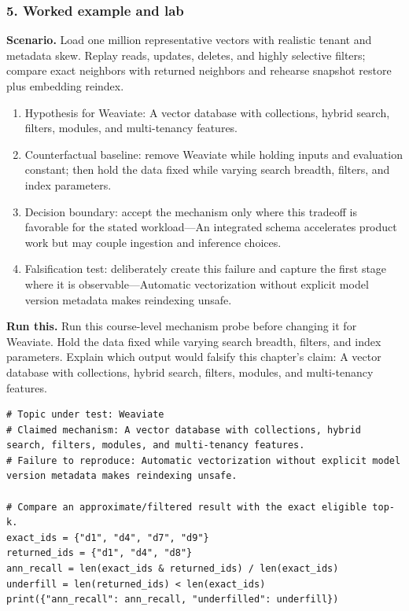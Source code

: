 \subsubsection*{5. Worked example and lab}
\textbf{Scenario.} Load one million representative vectors with realistic tenant and metadata skew. Replay reads, updates, deletes, and highly selective filters; compare exact neighbors with returned neighbors and rehearse snapshot restore plus embedding reindex.
\begin{enumerate}
\item Hypothesis for Weaviate: A vector database with collections, hybrid search, filters, modules, and multi-tenancy features.
\item Counterfactual baseline: remove Weaviate while holding inputs and evaluation constant; then hold the data fixed while varying search breadth, filters, and index parameters.
\item Decision boundary: accept the mechanism only where this tradeoff is favorable for the stated workload—An integrated schema accelerates product work but may couple ingestion and inference choices.
\item Falsification test: deliberately create this failure and capture the first stage where it is observable—Automatic vectorization without explicit model version metadata makes reindexing unsafe.
\end{enumerate}
\textbf{Run this.} Run this course-level mechanism probe before changing it for Weaviate. Hold the data fixed while varying search breadth, filters, and index parameters. Explain which output would falsify this chapter's claim: A vector database with collections, hybrid search, filters, modules, and multi-tenancy features.
\begin{Verbatim}[fontsize=\scriptsize]
# Topic under test: Weaviate
# Claimed mechanism: A vector database with collections, hybrid search, filters, modules, and multi-tenancy features.
# Failure to reproduce: Automatic vectorization without explicit model version metadata makes reindexing unsafe.

# Compare an approximate/filtered result with the exact eligible top-k.
exact_ids = {"d1", "d4", "d7", "d9"}
returned_ids = {"d1", "d4", "d8"}
ann_recall = len(exact_ids & returned_ids) / len(exact_ids)
underfill = len(returned_ids) < len(exact_ids)
print({"ann_recall": ann_recall, "underfilled": underfill})
\end{Verbatim}
